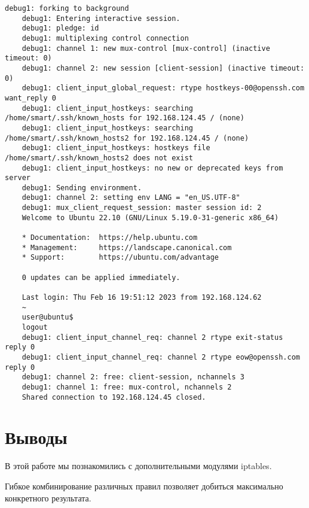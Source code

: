 \begin{Verbatim}[frame=single,breaklines=true,breakanywhere=true]
    debug1: forking to background
    debug1: Entering interactive session.
    debug1: pledge: id
    debug1: multiplexing control connection
    debug1: channel 1: new mux-control [mux-control] (inactive timeout: 0)
    debug1: channel 2: new session [client-session] (inactive timeout: 0)
    debug1: client_input_global_request: rtype hostkeys-00@openssh.com want_reply 0
    debug1: client_input_hostkeys: searching /home/smart/.ssh/known_hosts for 192.168.124.45 / (none)
    debug1: client_input_hostkeys: searching /home/smart/.ssh/known_hosts2 for 192.168.124.45 / (none)
    debug1: client_input_hostkeys: hostkeys file /home/smart/.ssh/known_hosts2 does not exist
    debug1: client_input_hostkeys: no new or deprecated keys from server
    debug1: Sending environment.
    debug1: channel 2: setting env LANG = "en_US.UTF-8"
    debug1: mux_client_request_session: master session id: 2
    Welcome to Ubuntu 22.10 (GNU/Linux 5.19.0-31-generic x86_64)

    * Documentation:  https://help.ubuntu.com
    * Management:     https://landscape.canonical.com
    * Support:        https://ubuntu.com/advantage

    0 updates can be applied immediately.

    Last login: Thu Feb 16 19:51:12 2023 from 192.168.124.62
    ~
    user@ubuntu$ 
    logout
    debug1: client_input_channel_req: channel 2 rtype exit-status reply 0
    debug1: client_input_channel_req: channel 2 rtype eow@openssh.com reply 0
    debug1: channel 2: free: client-session, nchannels 3
    debug1: channel 1: free: mux-control, nchannels 2
    Shared connection to 192.168.124.45 closed.
\end{Verbatim}

\section*{Выводы}

В этой работе мы познакомились с дополнительными модулями iptables.

Гибкое комбинирование различных правил позволяет добиться максимально конкретного результата.
